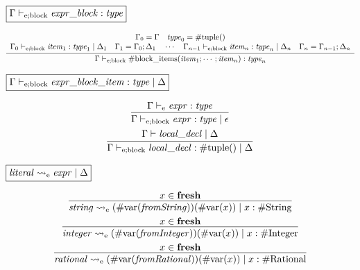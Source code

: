 $\fbox{$\Gamma \vdash_{\mathrm{e}; \mathrm{block}} \mathit{expr\_block}: \mathit{type}$}$

\begin{gather*}
    \infer{\Gamma \vdash_{\mathrm{e}; \mathrm{block}} \mathrm{\#block\_items}(\mathit{item}_1; \cdots; \mathit{item}_n): \mathit{type}_n}{
        \begin{array}{c}
            \Gamma_0 = \Gamma
            \hspace{1em}
            \mathit{type}_0 = \mathrm{\#tuple}()
            \\
            \Gamma_0 \vdash_{\mathrm{e}; \mathrm{block}} \mathit{item}_1: \mathit{type}_1 \mid \Delta_1
            \hspace{1em}
            \Gamma_1 = \Gamma_0; \Delta_1
            \hspace{1em}
            \cdots
            \hspace{1em}
            \Gamma_{n - 1} \vdash_{\mathrm{e}; \mathrm{block}} \mathit{item}_n: \mathit{type}_n \mid \Delta_n
            \hspace{1em}
            \Gamma_n = \Gamma_{n - 1}; \Delta_n
        \end{array}
    }
\end{gather*}

$\fbox{$\Gamma \vdash_{\mathrm{e}; \mathrm{block}} \mathit{expr\_block\_item}: \mathit{type} \mid \Delta$}$

\begin{gather*}
    \infer{\Gamma \vdash_{\mathrm{e}; \mathrm{block}} \mathit{expr}: \mathit{type} \mid \epsilon}{
        \Gamma \vdash_\mathrm{e} \mathit{expr}: \mathit{type}
    }
    \\
    \infer{\Gamma \vdash_{\mathrm{e}; \mathrm{block}} \mathit{local\_decl}: \mathrm{\#tuple}() \mid \Delta}{
        \Gamma \vdash \mathit{local\_decl} \mid \Delta
    }
\end{gather*}

$\fbox{$\mathit{literal} \rightsquigarrow_\mathrm{e} \mathit{expr} \mid \Delta$}$

\begin{gather*}
    \infer{\mathit{string} \rightsquigarrow_\mathrm{e} (\mathrm{\#var}(\mathit{fromString}))(\mathrm{\#var}(x)) \mid x: \mathrm{\#String}}{
        x \in \mathbf{fresh}
    }
    \\
    \infer{\mathit{integer} \rightsquigarrow_\mathrm{e} (\mathrm{\#var}(\mathit{fromInteger}))(\mathrm{\#var}(x)) \mid x: \mathrm{\#Integer}}{
        x \in \mathbf{fresh}
    }
    \\
    \infer{\mathit{rational} \rightsquigarrow_\mathrm{e} (\mathrm{\#var}(\mathit{fromRational}))(\mathrm{\#var}(x)) \mid x: \mathrm{\#Rational}}{
        x \in \mathbf{fresh}
    }
\end{gather*}

